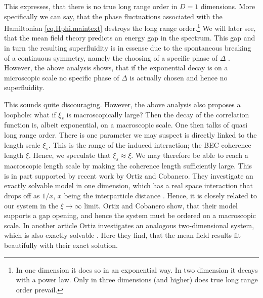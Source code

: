This expresses, that there is no true long range order in $D = 1$ dimensions. More specifically we can say, that the phase fluctuations associated with the Hamiltonian \eqref{eq.Hphi.maintext} destroys the long range order.\footnote{In one dimension it does so in an exponential way. In two dimension it decays with a power law. Only in three dimensions (and higher) does true long range order prevail.} We will later see, that the mean field theory predicts an energy gap in the spectrum. This gap and in turn the resulting superfluidity is in essense due to the spontaneous breaking of a continuous symmetry, namely the choosing of a specific phase of $\Delta$ \cite[pp. 341-346]{BruusFlensberg}. However, the above analysis shows, that if the exponential decay is on a microscopic scale no specific phase of $\Delta$ is actually chosen and hence no superfluidity. 

This sounds quite discouraging. However, the above analysis also proposes a loophole: what if $\xi_s$ is macroscopically large? Then the decay of the correlation function is, albeit exponential, on a macroscopic scale. One then talks of quasi long range order. There is one parameter we may suspect is directly linked to the length scale $\xi_s$. This is the range of the induced interaction; the BEC coherence length $\xi$. Hence, we speculate that $\xi_s \approx \xi$. We may therefore be able to reach a macroscopic length scale by making the coherence length sufficiently large. This is in part supported by recent work by Ortiz and Cobanero. They investigate an exactly solvable model in one dimension, which has a real space interaction that drops off as $1 / x$, $x$ being the interparticle distance \cite{Ortiz.Beyondmeanfieldtheory}. Hence, it is closely related to our system in the $\xi \to \infty$ limit. Ortiz and Cobanero show, that their model supports a gap opening, and hence the system must be ordered on a macroscopic scale. In another article Ortiz investigates an analogous two-dimensional system, which is also exactly solvable \cite{Ortiz.pxpy}. Here they find, that the mean field results fit beautifully with their exact solution.

